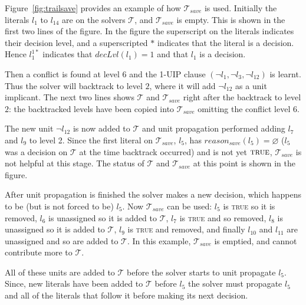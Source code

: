 \documentclass[runningheads]{llncs}
\newcommand{\trail}{\ensuremath{\mathcal{T}}}
\newcommand{\dlevel}[1]{\ensuremath{\mathit{decLvl}(#1)}}
\newcommand{\true}{\textsc{true}\xspace}
\newcommand{\reasonsave}[1]{\ensuremath{\mathit{reason_{\mathit{save}}(#1)}}}
\newcommand{\trailsave}{\trail_{\mathit{save}}}
\begin{document}
\begin{example}
    \label{ex:trailsave} Figure~\ref{fig:trailsave} provides an
    example of how $\trailsave$ is used. Initially the literals $l_1$
    to $l_{14}$ are on the solvers $\trail$, and $\trailsave$ is
    empty. This is shown in the first two lines of the figure. In the
    figure the superscript on the literals indicates their decision
    level, and a superscripted $*$ indicates that the literal is a
    decision. Hence $l_1^{1*}$ indicates that $\dlevel{l_1}=1$ and
    that $l_1$ is a decision.

    Then a conflict is found at level $6$ and the 1-UIP clause
    $(\lnot l_1, \lnot l_3, \lnot l_{12})$ is learnt. Thus the solver
    will backtrack to level $2$, where it will add $\lnot l_{12}$ as a
    unit implicant. The next two lines shows $\trail$ and $\trailsave$
    right after the backtrack to level $2$: the backtracked levels
    have been copied into $\trailsave$ omitting the conflict level $6$. 

    The new unit $\lnot l_{12}$ is now added to $\trail$ and unit
    propagation performed adding $l_7$ and $l_9$ to level 2. Since the
    first literal on $\trailsave$, $l_5$, has
    $\reasonsave{l_5}=\varnothing$ ($l_5$ was a decision on $\trail$
    at the time backtrack occurred) and is not yet $\true$,
    $\trailsave$ is not helpful at this stage. The status of $\trail$
    and $\trailsave$ at this point is shown in the figure.
    
    After unit propagation is finished the solver makes a new
    decision, which happens to be (but is not forced to be) $l_5$. Now
    $\trailsave$ can be used: $l_5$ is \true so it is removed, $l_6$
    is unassigned so it is added to $\trail$, $l_7$ is \true and so
    removed, $l_8$ is unassigned so it is added to $\trail$, $l_9$ is
    \true and removed, and finally $l_{10}$ and $l_{11}$ are
    unassigned and so are added to $\trail$. In this example,
    $\trailsave$ is emptied, and cannot contribute more to $\trail$.

    All of these units are added to $\trail$ before the solver starts
    to unit propagate $l_5$. Since, new literals have been added to
    $\trail$ before $l_5$ the solver must propagate $l_5$ and all of
    the literals that follow it before making its next
    decision. 
\end{example}
\end{document}
